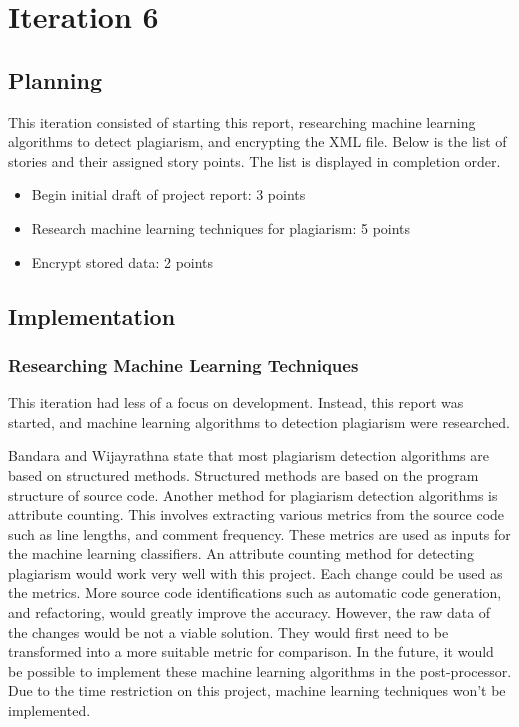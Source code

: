 \chapter{Iteration 6}
\section{Planning}
This iteration consisted of starting this report, researching machine learning algorithms to detect plagiarism, and encrypting the XML file. Below is the list of stories and their assigned story points. The list is displayed in completion order.

\begin{itemize}
\item Begin initial draft of project report: 3 points
\item Research machine learning techniques for plagiarism: 5 points
\item Encrypt stored data: 2 points
\end{itemize}

\section{Implementation}
\subsection{Researching Machine Learning Techniques}
This iteration had less of a focus on development. Instead, this report was started, and machine learning algorithms to detection plagiarism were researched.

Bandara and Wijayrathna state that most plagiarism detection algorithms are based on structured methods\cite{Bandara2012}. Structured methods are based on the program structure of source code. Another method for plagiarism detection algorithms is attribute counting. This involves extracting various metrics from the source code such as line lengths, and comment frequency. These metrics are used as inputs for the machine learning classifiers. An attribute counting method for detecting plagiarism would work very well with this project. Each change could be used as the metrics. More source code identifications such as automatic code generation, and refactoring, would greatly improve the accuracy. However, the raw data of the changes would be not a viable solution. They would first need to be transformed into a more suitable metric for comparison. In the future, it would be possible to implement these machine learning algorithms in the post-processor. Due to the time restriction on this project, machine learning techniques won't be implemented.

